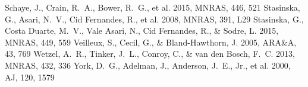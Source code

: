 \documentclass[twocolumn]{aastex631}
\begin{document}
\begin{thebibliography}{}
 Schaye, J., Crain, R.~A., Bower, R.~G., et al. 2015, MNRAS, 446, 521
 Stasinska, G., Asari, N.~V., Cid Fernandes, R., et al. 2008, MNRAS, 391, L29
 Stasinska, G., Costa Duarte, M.~V., Vale Asari, N., Cid Fernandes, R., \& Sodre, L. 2015, MNRAS, 449, 559
 Veilleux, S., Cecil, G., \& Bland-Hawthorn, J. 2005, ARA\&A, 43, 769
 Wetzel, A.~R., Tinker, J.~L., Conroy, C., \& van den Bosch, F.~C. 2013, MNRAS, 432, 336
 York, D.~G., Adelman, J., Anderson, J.~E., Jr., et al. 2000, AJ, 120, 1579
\end{thebibliography}
\end{document}
